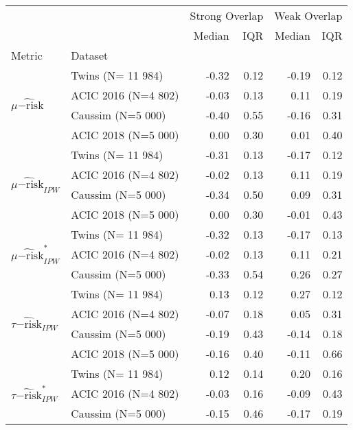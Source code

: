 \begin{tabular}{llrrrr}
\toprule
 &  & \multicolumn{2}{r}{Strong Overlap} & \multicolumn{2}{r}{Weak Overlap} \\
 &  & Median & IQR & Median & IQR \\
Metric & Dataset &  &  &  &  \\
\midrule
\multirow[c]{4}{*}{$\widehat{\mu\mathrm{-risk}}$} & Twins 
 (N= 11 984) & -0.32 & 0.12 & -0.19 & 0.12 \\
\cline{2-6}
 & ACIC 2016
 (N=4 802) & -0.03 & 0.13 & 0.11 & 0.19 \\
\cline{2-6}
 & Caussim
 (N=5 000) & -0.40 & 0.55 & -0.16 & 0.31 \\
\cline{2-6}
 & ACIC 2018 
 (N=5 000) & 0.00 & 0.30 & 0.01 & 0.40 \\
\cline{1-6} \cline{2-6}
\multirow[c]{4}{*}{$\widehat{\mu\mathrm{-risk}}_{IPW}$} & Twins 
 (N= 11 984) & -0.31 & 0.13 & -0.17 & 0.12 \\
\cline{2-6}
 & ACIC 2016
 (N=4 802) & -0.02 & 0.13 & 0.11 & 0.19 \\
\cline{2-6}
 & Caussim
 (N=5 000) & -0.34 & 0.50 & 0.09 & 0.31 \\
\cline{2-6}
 & ACIC 2018 
 (N=5 000) & 0.00 & 0.30 & -0.01 & 0.43 \\
\cline{1-6} \cline{2-6}
\multirow[c]{3}{*}{$\widehat{\mu\mathrm{-risk}}^{*}_{IPW}$} & Twins 
 (N= 11 984) & -0.32 & 0.13 & -0.17 & 0.13 \\
\cline{2-6}
 & ACIC 2016
 (N=4 802) & -0.02 & 0.13 & 0.11 & 0.21 \\
\cline{2-6}
 & Caussim
 (N=5 000) & -0.33 & 0.54 & 0.26 & 0.27 \\
\cline{1-6} \cline{2-6}
\multirow[c]{4}{*}{$\widehat{\tau\mathrm{-risk}}_{IPW}$} & Twins 
 (N= 11 984) & 0.13 & 0.12 & 0.27 & 0.12 \\
\cline{2-6}
 & ACIC 2016
 (N=4 802) & -0.07 & 0.18 & 0.05 & 0.31 \\
\cline{2-6}
 & Caussim
 (N=5 000) & -0.19 & 0.43 & -0.14 & 0.18 \\
\cline{2-6}
 & ACIC 2018 
 (N=5 000) & -0.16 & 0.40 & -0.11 & 0.66 \\
\cline{1-6} \cline{2-6}
\multirow[c]{3}{*}{$\widehat{\tau\mathrm{-risk}}_{IPW}^{*}$} & Twins 
 (N= 11 984) & 0.12 & 0.14 & 0.20 & 0.16 \\
\cline{2-6}
 & ACIC 2016
 (N=4 802) & -0.03 & 0.16 & -0.09 & 0.43 \\
\cline{2-6}
 & Caussim
 (N=5 000) & -0.15 & 0.46 & -0.17 & 0.19 \\

\end{tabular}
